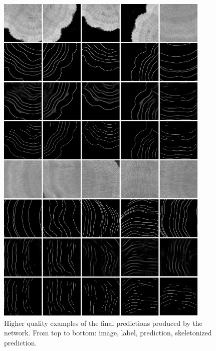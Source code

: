 \begin{figure}[!p]
    \centering
    \includegraphics[width=0.91\textwidth]{images/final-results-good.png}
    \caption{Higher quality examples of the final predictions produced by the network. From top to bottom: image, label, prediction, skeletonized prediction.}
    \label{fig:finalresultsgood}
\end{figure}

